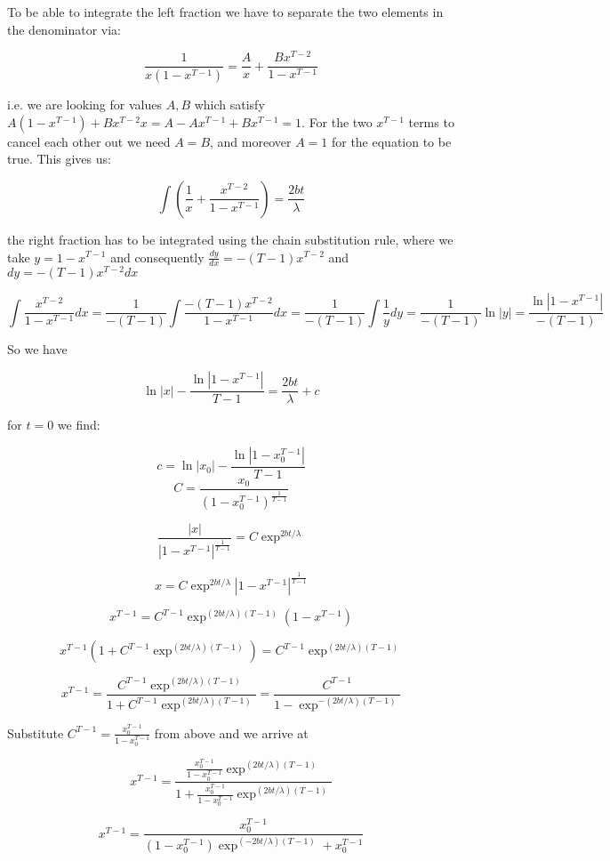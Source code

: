 To be able to integrate the left fraction we have to separate the two elements in the denominator via:

$$\frac{1}{x(1-x^{T-1})}=\frac{A}{x}+\frac{Bx^{T-2}}{1-x^{T-1}}$$

i.e. we are looking for values $A, B$ which satisfy $A(1-x^{T-1})+Bx^{T-2}x=A-Ax^{T-1}+Bx^{T-1}=1$. For the two $x^{T-1}$ terms to cancel each other out we need $A=B$, and moreover $A=1$ for the equation to be true. This gives us:

$$\int(\frac{1}{x} + \frac{x^{T-2}}{1-x^{T-1}})=\frac{2bt}{\lambda}$$

the right fraction has to be integrated using the chain substitution rule, where we take $y=1-x^{T-1}$ and consequently $\frac{dy}{dx}=-(T-1)x^{T-2}$ and $dy=-(T-1)x^{T-2}dx$

$$\int\frac{x^{T-2}}{1-x^{T-1}}dx=\frac{1}{-(T-1)}\int\frac{-(T-1)x^{T-2}}{1-x^{T-1}}dx=\frac{1}{-(T-1)}\int\frac{1}{y}dy=\frac{1}{-(T-1)}\ln|y|=\frac{\ln|1-x^{T-1}|}{-(T-1)}$$

So we have

$$\ln|x|-\frac{\ln|1-x^{T-1}|}{T-1}=\frac{2bt}{\lambda}+c$$

for $t=0$ we find:

$$c=\ln|x_0|-\frac{\ln|1-x_0^{T-1}|}{T-1}$$
$$C=\frac{x_0}{(1-x_0^{T-1})^\frac{1}{T-1}}$$

$$\frac{|x|}{|1-x^{T-1}|^\frac{1}{T-1}}=C\exp^{2bt/\lambda}$$

$$x=C\exp^{2bt/\lambda}|1-x^{T-1}|^\frac{1}{T-1}$$

$$x^{T-1}=C^{T-1}\exp^{(2bt/\lambda)(T-1)}(1-x^{T-1})$$

$$x^{T-1}(1+C^{T-1}\exp^{(2bt/\lambda)(T-1)})=C^{T-1}\exp^{(2bt/\lambda)(T-1)}$$

$$x^{T-1}=\frac{C^{T-1}\exp^{(2bt/\lambda)(T-1)}}{1+C^{T-1}\exp^{(2bt/\lambda)(T-1)}}=\frac{C^{T-1}}{1-\exp^{-(2bt/\lambda)(T-1)}}$$

Substitute $C^{T-1}=\frac{x_0^{T-1}}{1-x_0^{T-1}}$ from above and we arrive at

$$x^{T-1}=\frac{\frac{x_0^{T-1}}{1-x_0^{T-1}}\exp^{(2bt/\lambda)(T-1)}}{1+\frac{x_0^{T-1}}{1-x_0^{T-1}}\exp^{(2bt/\lambda)(T-1)}}$$

$$x^{T-1}=\frac{x_0^{T-1}}{(1-x_0^{T-1})\exp^{(-2bt/\lambda)(T-1)}+x_0^{T-1}}$$


